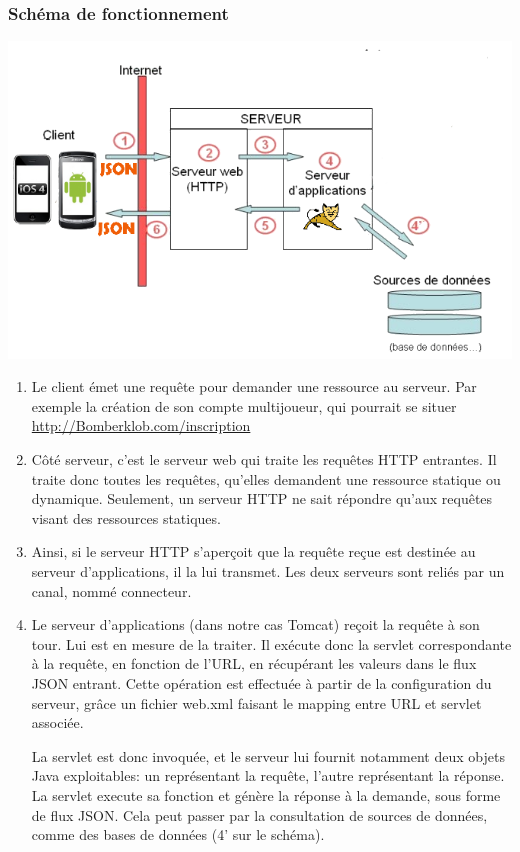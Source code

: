 \documentclass[]{report}
\begin{document}
		\subsubsection{Schéma de fonctionnement }
		
		\begin{center}
			\includegraphics[width=16cm]{./ressources/serveurappli.png}
		\end{center}
		
		\begin{enumerate}[1]
		 \item Le client émet une requête pour demander une
			ressource au serveur. Par exemple la création de son compte multijoueur,
			qui pourrait se situer \url{http://Bomberklob.com/inscription}
		\item Côté serveur, c'est le serveur web qui traite les
			requêtes HTTP entrantes. Il traite donc toutes les requêtes, qu'elles
			demandent une ressource statique ou dynamique. Seulement, un serveur HTTP ne
			sait répondre qu'aux requêtes visant des ressources statiques.
		\item Ainsi, si le serveur HTTP s'aperçoit que la requête reçue est destinée
		au serveur d'applications, il la lui transmet. Les deux serveurs sont reliés par un canal, nommé connecteur.
		
		\item Le serveur d'applications (dans notre cas Tomcat) reçoit la requête à
		son tour. Lui est en mesure de la traiter. Il exécute donc la servlet
		correspondante à la requête, en fonction de l'URL, en récupérant les valeurs
		dans le flux JSON entrant. Cette opération est effectuée à partir de la
		configuration du serveur, grâce un fichier web.xml faisant le mapping entre URL et servlet associée. 
		
		La servlet est donc invoquée, et le serveur lui fournit notamment deux objets
		Java exploitables: un représentant la requête, l'autre représentant la réponse.
		La servlet execute sa fonction et génère la réponse à la demande, sous forme
		de flux JSON. Cela peut passer par la consultation de sources de données,
		comme des bases de données (4' sur le schéma).		
		
		\end{enumerate}
		
\end{document}
